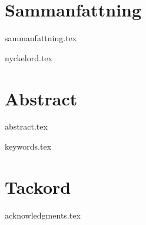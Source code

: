 %

\maketitle
\thispagestyle{empty}
\clearpage{\pagestyle{empty}\cleardoublepage}


%
\setcounter{page}{1}
\chapter*{Sammanfattning}
\thispagestyle{plain}
%
{sammanfattning.tex}
  \begin{keywords}
    {nyckelord.tex}
  \end{keywords}
\cleardoublepage

%

\chapter*{Abstract}
\thispagestyle{plain}
%
\begin{otherlanguage}{english}
{abstract.tex}
  \begin{keywords}
    {keywords.tex}
  \end{keywords}
\end{otherlanguage}
\cleardoublepage

%
\chapter*{Tackord}
\thispagestyle{plain}
%
{acknowledgments.tex}
\cleardoublepage

%
\tableofcontents
\thispagestyle{plain}
\cleardoublepage

%

\listoffigures
\cleardoublepage

%

\listoftables
\cleardoublepage